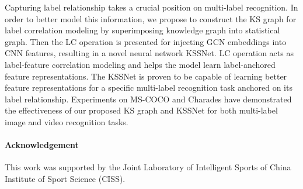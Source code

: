 \documentclass[letterpaper]{article} \usepackage{aaai20}  \usepackage{times}  \usepackage{helvet} \usepackage{courier}  \usepackage[hyphens]{url}  \usepackage{graphicx} \usepackage{subfigure}
\begin{document}
Capturing label relationship takes a crucial position on multi-label recognition. In order to better model this information, we propose to construct the KS graph for label correlation modeling by superimposing knowledge graph into statistical graph. Then the LC operation is presented for injecting GCN embeddings into CNN features, resulting in a novel neural network KSSNet. LC operation acts as label-feature correlation modeling and helps the model learn label-anchored feature representations. The KSSNet is proven to be capable of learning better feature representations for a specific multi-label recognition task anchored on its label relationship. Experiments on MS-COCO and Charades have demonstrated the effectiveness of our proposed KS graph and KSSNet for both multi-label image and video recognition tasks.

\paragraph{Acknowledgement} This work was supported by the Joint Laboratory of Intelligent Sports of China Institute of Sport Science (CISS).
	
{	
	\small
	
	
}
\end{document}
